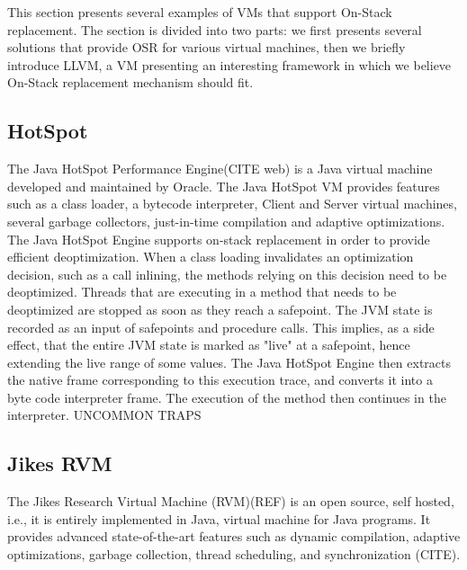 This section presents several examples of VMs that support On-Stack replacement. 
The section is divided into two parts: we first presents several solutions that provide OSR for various virtual machines, then we briefly introduce LLVM, a VM presenting an interesting framework in which we believe On-Stack replacement mechanism should fit.\\ 

\subsection{HotSpot}\label{HotSpot}

The Java HotSpot Performance Engine(CITE web) is a Java virtual machine developed and maintained by Oracle.
The Java HotSpot VM provides features such as a class loader, a bytecode interpreter, Client and Server virtual machines, several garbage collectors, just-in-time compilation and adaptive optimizations.\\

The Java HotSpot Engine supports on-stack replacement in order to provide efficient deoptimization\cite{paleczny2001java}.
When a class loading invalidates an optimization decision, such as a call inlining, the methods relying on this decision need to be deoptimized.
Threads that are executing in a method that needs to be deoptimized are stopped as soon as they reach a safepoint.
The JVM state is recorded as an input of safepoints and procedure calls.
This implies, as a side effect, that the entire JVM state is marked as "live" at a safepoint, hence extending the live range of some values.
The Java HotSpot Engine then extracts the native frame corresponding to this execution trace, and converts it into a byte code interpreter frame.
The execution of the method then continues in the interpreter.
UNCOMMON TRAPS\\

\subsection{Jikes RVM}

The Jikes Research Virtual Machine (RVM)(REF) is an open source, self hosted, i.e., it is entirely implemented in Java, virtual machine for Java programs.
It provides advanced state-of-the-art features such as dynamic compilation, adaptive optimizations, garbage collection, thread scheduling, and synchronization (CITE).\\

